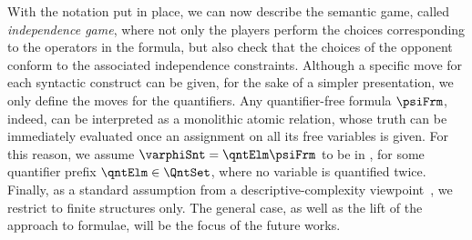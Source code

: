 \documentclass[authoryear]{elsarticle}
\begin{document}
With the notation put in place, we can now describe the semantic game, called
\emph{independence game}, where not only the players perform the choices
corresponding to the operators in the formula, but also check that the choices
of the opponent conform to the associated independence constraints.
Although a specific move for each \ADIF syntactic construct can be given, for
the sake of a simpler presentation, we only define the moves for the
quantifiers.
Any quantifier-free \FOL formula $\psiFrm$, indeed, can be interpreted as a
monolithic atomic relation, whose truth can be immediately evaluated once an
assignment on all its free variables is given.
For this reason, we assume $\varphiSnt = \qntElm \psiFrm$ to be in \pnf, for
some quantifier prefix $\qntElm \in \QntSet$, where no variable is quantified
twice.
Finally, as a standard assumption from a descriptive-complexity
viewpoint~\citep{Imm99,GKLMSVVW05}, we restrict to finite structures only.
The general case, as well as the lift of the approach to formulae, will be the
focus of the future works.
\end{document}
